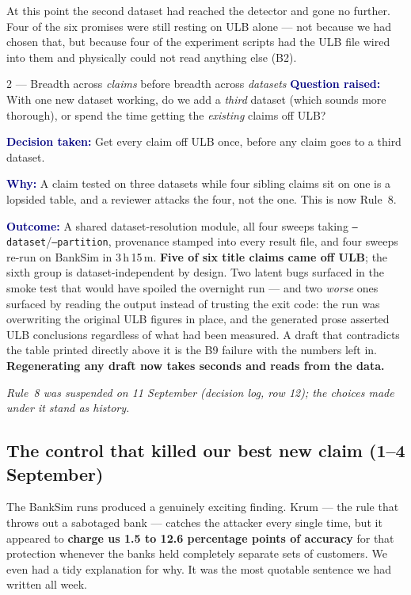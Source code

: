 \documentclass[11pt]{article}
\newcommand{\qlabel}[1]{\textbf{\textcolor{navy}{#1}}\;}
\begin{document}
At this point the second dataset had reached the detector and gone no further. Four of the six promises
were still resting on ULB alone --- not because we had chosen that, but because four of the experiment
scripts had the ULB file wired into them and physically could not read anything else (B2).

\begin{decision}{2 --- Breadth across \emph{claims} before breadth across \emph{datasets}}
\qlabel{Question raised:} With one new dataset working, do we add a \emph{third} dataset (which sounds
more thorough), or spend the time getting the \emph{existing} claims off ULB?

\qlabel{Decision taken:} Get every claim off ULB once, before any claim goes to a third dataset.

\qlabel{Why:} A claim tested on three datasets while four sibling claims sit on one is a lopsided
table, and a reviewer attacks the four, not the one. This is now Rule~8.

\qlabel{Outcome:} A shared dataset-resolution module, all four sweeps taking
\texttt{--dataset}/\texttt{--partition}, provenance stamped into every result file, and four sweeps
re-run on BankSim in 3\,h\,15\,m. \textbf{Five of six title claims came off ULB}; the sixth group is
dataset-independent by design. Two latent bugs surfaced in the smoke test that would have spoiled the
overnight run --- and two \emph{worse} ones surfaced by reading the output instead of trusting the exit
code: the run was overwriting the original ULB figures in place, and the generated prose asserted ULB
conclusions regardless of what had been measured. A draft that contradicts the table printed directly
above it is the B9 failure with the numbers left in. \textbf{Regenerating any draft now takes seconds
and reads from the data.}

\emph{Rule~8 was suspended on 11 September (decision log, row 12); the choices made under it stand as
history.}
\end{decision}

\subsection{The control that killed our best new claim (1--4 September)}
\label{sec:control}

The BankSim runs produced a genuinely exciting finding. Krum --- the rule that throws out a sabotaged
bank --- catches the attacker every single time, but it appeared to \textbf{charge us 1.5 to 12.6
percentage points of accuracy} for that protection whenever the banks held completely separate sets of
customers. We even had a tidy explanation for why. It was the most quotable sentence we had written all
week.
\end{document}
